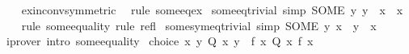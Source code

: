 \begin{isabellebody}
%
\isadelimproof
\ \ %
\endisadelimproof
%
\isatagproof
{}\isamarkupfalse%
\ ex{\isacharunderscore}{\kern0pt}in{\isacharunderscore}{\kern0pt}conv{\isacharbrackleft}{\kern0pt}symmetric{\isacharbrackright}{\kern0pt}\ \isamarkupfalse%
\ {\isacharparenleft}{\kern0pt}rule\ some{\isacharunderscore}{\kern0pt}eq{\isacharunderscore}{\kern0pt}ex{\isacharparenright}{\kern0pt}%
\endisatagproof
{\isafoldproof}%
%
\isadelimproof
\isanewline
%
\endisadelimproof
\isanewline
{}\isamarkupfalse%
\ some{\isacharunderscore}{\kern0pt}eq{\isacharunderscore}{\kern0pt}trivial\ {\isacharbrackleft}{\kern0pt}simp{\isacharbrackright}{\kern0pt}{\isacharcolon}{\kern0pt}\ {\isachardoublequoteopen}{\isacharparenleft}{\kern0pt}SOME\ y{\isachardot}{\kern0pt}\ y\ {\isacharequal}{\kern0pt}\ x{\isacharparenright}{\kern0pt}\ {\isacharequal}{\kern0pt}\ x{\isachardoublequoteclose}\isanewline
%
\isadelimproof
\ \ %
\endisadelimproof
%
\isatagproof
{}\isamarkupfalse%
\ {\isacharparenleft}{\kern0pt}rule\ some{\isacharunderscore}{\kern0pt}equality{\isacharparenright}{\kern0pt}\ {\isacharparenleft}{\kern0pt}rule\ refl{\isacharparenright}{\kern0pt}%
\endisatagproof
{\isafoldproof}%
%
\isadelimproof
\isanewline
%
\endisadelimproof
\isanewline
{}\isamarkupfalse%
\ some{\isacharunderscore}{\kern0pt}sym{\isacharunderscore}{\kern0pt}eq{\isacharunderscore}{\kern0pt}trivial\ {\isacharbrackleft}{\kern0pt}simp{\isacharbrackright}{\kern0pt}{\isacharcolon}{\kern0pt}\ {\isachardoublequoteopen}{\isacharparenleft}{\kern0pt}SOME\ y{\isachardot}{\kern0pt}\ x\ {\isacharequal}{\kern0pt}\ y{\isacharparenright}{\kern0pt}\ {\isacharequal}{\kern0pt}\ x{\isachardoublequoteclose}\isanewline
%
\isadelimproof
\ \ %
\endisadelimproof
%
\isatagproof
{}\isamarkupfalse%
\ {\isacharparenleft}{\kern0pt}iprover\ intro{\isacharcolon}{\kern0pt}\ some{\isacharunderscore}{\kern0pt}equality{\isacharparenright}{\kern0pt}%
\endisatagproof
{\isafoldproof}%
%
\isadelimproof
%
\endisadelimproof
%
\isadelimdocument
%
\endisadelimdocument
%
\isatagdocument
%
\isamarkuptrue%
%
\endisatagdocument
{\isafolddocument}%
%
\isadelimdocument
%
\endisadelimdocument
{}\isamarkupfalse%
\ choice{\isacharcolon}{\kern0pt}\ {\isachardoublequoteopen}{\isasymforall}x{\isachardot}{\kern0pt}\ {\isasymexists}y{\isachardot}{\kern0pt}\ Q\ x\ y\ {\isasymLongrightarrow}\ {\isasymexists}f{\isachardot}{\kern0pt}\ {\isasymforall}x{\isachardot}{\kern0pt}\ Q\ x\ {\isacharparenleft}{\kern0pt}f\ x{\isacharparenright}{\kern0pt}{\isachardoublequoteclose}\isanewline

\end{isabellebody}
